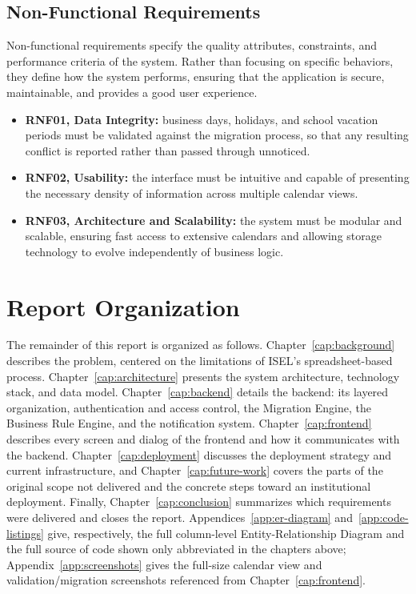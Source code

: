 \subsection{Non-Functional Requirements} \label{sec:non-functional-requirements}

Non-functional requirements specify the quality attributes, constraints, and performance criteria of the system. Rather than focusing on specific behaviors, they define how the system performs, ensuring that the application is secure, maintainable, and provides a good user experience.

\begin{itemize}
    \item \textbf{RNF01, Data Integrity:} business days, holidays, and school vacation periods must be validated against the migration process, so that any resulting conflict is reported rather than passed through unnoticed.
    \item \textbf{RNF02, Usability:} the interface must be intuitive and capable of presenting the necessary density of information across multiple calendar views.
    \item \textbf{RNF03, Architecture and Scalability:} the system must be modular and scalable, ensuring fast access to extensive calendars and allowing storage technology to evolve independently of business logic.
\end{itemize}

\section{Report Organization} \label{sec:organization}

The remainder of this report is organized as follows. Chapter~\ref{cap:background} describes the problem, centered on the limitations of ISEL's spreadsheet-based process. Chapter~\ref{cap:architecture} presents the system architecture, technology stack, and data model. Chapter~\ref{cap:backend} details the backend: its layered organization, authentication and access control, the Migration Engine, the Business Rule Engine, and the notification system. Chapter~\ref{cap:frontend} describes every screen and dialog of the frontend and how it communicates with the backend. Chapter~\ref{cap:deployment} discusses the deployment strategy and current infrastructure, and Chapter~\ref{cap:future-work} covers the parts of the original scope not delivered and the concrete steps toward an institutional deployment. Finally, Chapter~\ref{cap:conclusion} summarizes which requirements were delivered and closes the report. Appendices~\ref{app:er-diagram} and~\ref{app:code-listings} give, respectively, the full column-level Entity-Relationship Diagram and the full source of code shown only abbreviated in the chapters above; Appendix~\ref{app:screenshots} gives the full-size calendar view and validation/migration screenshots referenced from Chapter~\ref{cap:frontend}.
